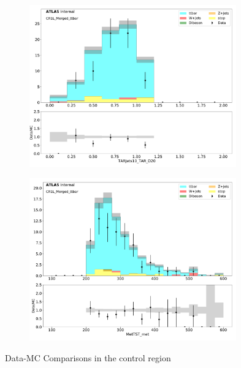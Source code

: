 \begin{figure}[htbp]
\begin{subfigure}{0.49\textwidth}
     \includegraphics[width = 0.98\textwidth]{Figures/4/datamc/CR1L_Merged_ttbar/TARJets10_TAR_D20.pdf}
     \caption{\DtwoTAR}
     \end{subfigure}
     \begin{subfigure}{0.49\textwidth}
     \includegraphics[width = 0.98\textwidth]{Figures/4/datamc/CR1L_Merged_ttbar/MetTST_met.pdf}
     \caption{\met}
     \end{subfigure}

     \caption{Data-MC Comparisons in the \merged \ttbar control region}
     \label{fig:Data_MC_CRbV_merged}
  \end{figure}

